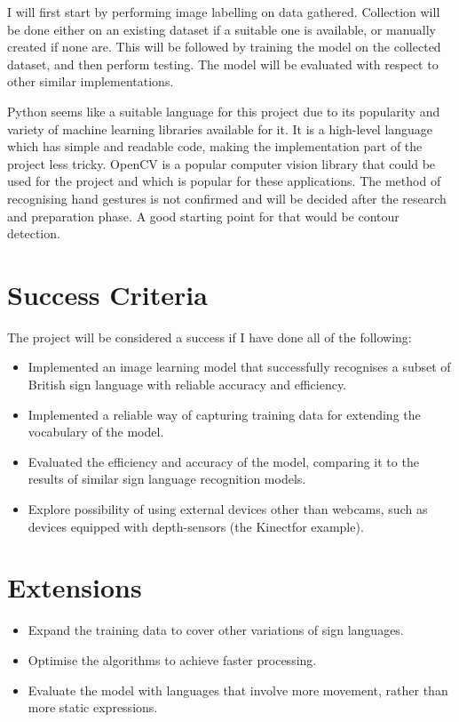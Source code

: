 \documentclass[12pt,a4paper,twoside]{article}
\begin{document}
I will first start by performing image labelling on data gathered. Collection will be done either on an existing dataset if a suitable one is available, or manually created if none are. This will be followed by training the model on the collected dataset, and then perform testing. The model will be evaluated with respect to other similar implementations.

Python seems like a suitable language for this project due to its popularity and variety of machine learning libraries available for it. It is a high-level language which has simple and readable code, making the implementation part of the project less tricky. OpenCV is a popular computer vision library that could be used for the project and which is popular for these applications. The method of recognising hand gestures is not confirmed and will be decided after the research and preparation phase. A good starting point for that would be contour detection.

\section*{Success Criteria}

The project will be considered a success if I have done all of the following:
\begin{itemize}
    \item Implemented an image learning model that successfully recognises a subset of British sign language with reliable accuracy and efficiency.
    \item Implemented a reliable way of capturing training data for extending the vocabulary of the model.
    \item Evaluated the efficiency and accuracy of the model, comparing it to the results of similar sign language recognition models.
    \item Explore possibility of using external devices other than webcams, such as devices equipped with depth-sensors (the Kinect\footnotemark for example).


\end{itemize}

\section*{Extensions}
\begin{itemize}
    \item Expand the training data to cover other variations of sign languages.
    \item Optimise the algorithms to achieve faster processing.
    \item Evaluate the model with languages that involve more movement, rather than more static expressions.

\end{itemize}
\end{document}
